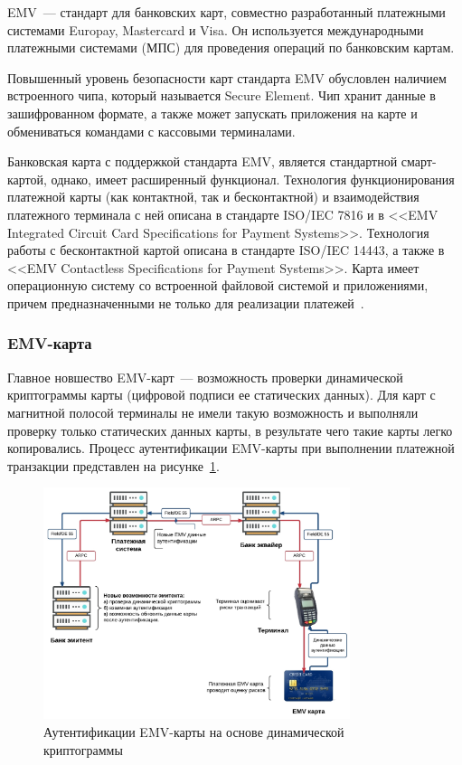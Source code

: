 EMV~--- стандарт для банковских карт, совместно разработанный платежными системами Europay, Mastercard и Visa.
Он используется  международными платежными системами (МПС) для проведения операций по банковским картам.

Повышенный уровень безопасности карт стандарта EMV обусловлен наличием встроенного чипа, который называется Secure Element.
Чип хранит данные в зашифрованном формате, а также может запускать приложения на карте и обмениваться командами с кассовыми терминалами.

Банковская карта с поддержкой стандарта EMV, является стандартной смарт-картой, однако, имеет расширенный функционал.
Технология функционирования платежной карты (как контактной, так и бесконтактной) и взаимодействия платежного терминала с ней описана в стандарте ISO/IEC 7816 и в <<EMV Integrated Circuit Card Specifications for Payment Systems>>.
Технология работы с бесконтактной картой описана в стандарте ISO/IEC 14443, а также в <<EMV Contactless Specifications for Payment Systems>>.
Карта имеет операционную систему со встроенной файловой системой и приложениями, причем предназначенными не только для реализации платежей~\cite{emv_specifications_book}.

\subsubsection{EMV-карта}

Главное новшество EMV-карт~--- возможность проверки динамической криптограммы карты (цифровой подписи ее статических данных).
Для карт с магнитной полосой терминалы не имели такую возможность и выполняли проверку только статических данных карты, в результате чего такие карты легко копировались.
Процесс аутентификации EMV-карты при выполнении платежной транзакции представлен на рисунке~\ref{fig:emv_card_auth}.

\begin{figure}[H]
    \centering
    \includegraphics[width=0.8\textwidth]{images/research/emv_card_auth}
    \caption{\centering Аутентификации EMV-карты на основе динамической криптограммы }
    \label{fig:emv_card_auth}
\end{figure}

